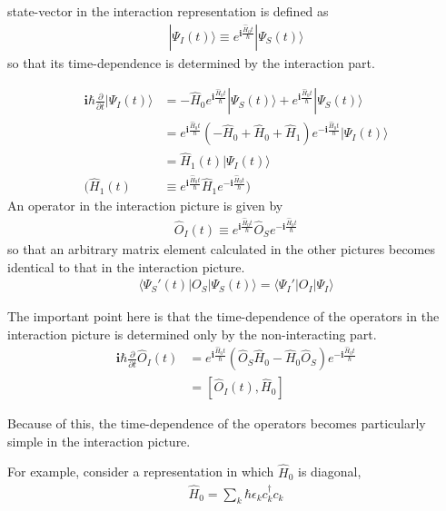 ﻿\documentclass[twoside]{book}
\numberwithin{equation}{section}
\begin{document}
 state-vector in the interaction representation is defined as
\begin{align}
|\Psi_I(t)\rangle \equiv e^{\bm{i}  \frac{\hat H_0t}{\hbar}}|\Psi_S(t)\rangle
\end{align}
so that its time-dependence is determined by the interaction part.

\begin{align}
\bm{i} \hbar \frac{\partial}{\partial t} |\Psi_I(t)\rangle & =  -\hat H_0 e^{\bm{i}  \frac{\hat H_0t}{\hbar}}|\Psi_S(t)\rangle+e^{\bm{i}  \frac{\hat H_0t}{\hbar}}|\Psi_S(t)\rangle \nonumber \\
& =  e^{\bm{i}  \frac{\hat H_0t}{\hbar}}(-\hat H_0+\hat H_0+\hat H_1)e^{-\bm{i}  \frac{\hat H_0t}{\hbar}} |\Psi_I(t)\rangle \nonumber \\
& =  \hat H_1(t)|\Psi_I(t)\rangle  \\
(\hat H_1(t) &  \equiv e^{\bm{i}  \frac{\hat H_0t}{\hbar}}\hat H_1 e^{-\bm{i}  \frac{\hat H_0t}{\hbar}}  ) \nonumber
\end{align}
 An operator in the interaction picture is given by 
\begin{align}\label{2-1-5}
\hat O_I(t) \equiv e^{\bm{i}  \frac{\hat H_0t}{\hbar}}\hat O_S e^{-\bm{i}  \frac{\hat H_0t}{\hbar}}
\end{align}
so that an arbitrary matrix element calculated in the other pictures becomes identical to that in the interaction picture.
\begin{align}
\langle\Psi_S'(t)|O_S|\Psi_S(t)\rangle=\langle\Psi_I'|O_I|\Psi_I\rangle \nonumber
\end{align}

 The important point here is that the time-dependence of the operators in
the interaction picture is determined only by the non-interacting part.
\begin{align}
\bm{i} \hbar \frac{\partial}{\partial t} \hat O_I(t) &= e^{\bm{i}  \frac{\hat H_0t}{\hbar}}(\hat O_S \hat H_0 - \hat H_0\hat O_S) e^{-\bm{i}  \frac{\hat H_0t}{\hbar}} \nonumber \\
&=[\hat O_I(t), \hat H_0] \nonumber
\end{align}

 Because of this, the time-dependence of the operators becomes particularly simple in the interaction picture.

 For example, consider a representation in which $\hat H_0$ is diagonal,
\begin{align}
\hat H_0= \sum_k \hbar \epsilon_k c_k^{\dagger} c_k \nonumber
\end{align}
\end{document}
